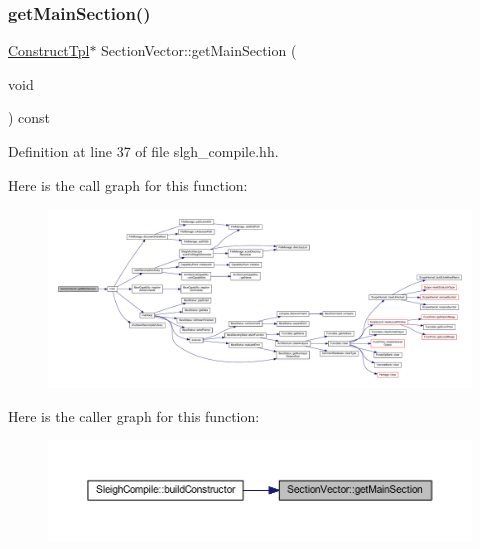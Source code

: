 \subsubsection{\texorpdfstring{getMainSection()}{getMainSection()}}
{\footnotesize\ttfamily \mbox{\hyperlink{class_construct_tpl}{Construct\+Tpl}}$\ast$ Section\+Vector\+::get\+Main\+Section (\begin{DoxyParamCaption}\item[{void}]{ }\end{DoxyParamCaption}) const\hspace{0.3cm}{\ttfamily [inline]}}



Definition at line 37 of file slgh\+\_\+compile.\+hh.

Here is the call graph for this function\+:
\nopagebreak
\begin{figure}[H]
\begin{center}
\leavevmode
\includegraphics[width=350pt]{class_section_vector_a997580aa88cc1f26aabc9317ccd3d035_cgraph}
\end{center}
\end{figure}
Here is the caller graph for this function\+:
\nopagebreak
\begin{figure}[H]
\begin{center}
\leavevmode
\includegraphics[width=350pt]{class_section_vector_a997580aa88cc1f26aabc9317ccd3d035_icgraph}
\end{center}
\end{figure}
\mbox{\label{class_section_vector_a1656d5dbb035df63c1c943bdf5e8191a}} 
